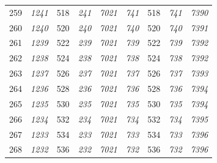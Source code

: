 \documentclass[10pt,fleqn]{article}
\begin{document}
\begin{longtable}{c|cccccccc}
259 & {\color{blue} \it 1241 \rm} & {\color{black} 518} & {\color{blue} \it 241 \rm} & {\color{blue} \it 7021 \rm} & {\color{blue} \it 741 \rm} & {\color{black} 518} & {\color{blue} \it 741 \rm} & {\color{blue} \it 7390 \rm} \\
260 & {\color{blue} \it 1240 \rm} & {\color{black} 520} & {\color{blue} \it 240 \rm} & {\color{blue} \it 7021 \rm} & {\color{blue} \it 740 \rm} & {\color{black} 520} & {\color{blue} \it 740 \rm} & {\color{blue} \it 7391 \rm} \\
261 & {\color{blue} \it 1239 \rm} & {\color{black} 522} & {\color{blue} \it 239 \rm} & {\color{blue} \it 7021 \rm} & {\color{blue} \it 739 \rm} & {\color{black} 522} & {\color{blue} \it 739 \rm} & {\color{blue} \it 7392 \rm} \\
262 & {\color{blue} \it 1238 \rm} & {\color{black} 524} & {\color{blue} \it 238 \rm} & {\color{blue} \it 7021 \rm} & {\color{blue} \it 738 \rm} & {\color{black} 524} & {\color{blue} \it 738 \rm} & {\color{blue} \it 7392 \rm} \\
263 & {\color{blue} \it 1237 \rm} & {\color{black} 526} & {\color{blue} \it 237 \rm} & {\color{blue} \it 7021 \rm} & {\color{blue} \it 737 \rm} & {\color{black} 526} & {\color{blue} \it 737 \rm} & {\color{blue} \it 7393 \rm} \\
264 & {\color{blue} \it 1236 \rm} & {\color{black} 528} & {\color{blue} \it 236 \rm} & {\color{blue} \it 7021 \rm} & {\color{blue} \it 736 \rm} & {\color{black} 528} & {\color{blue} \it 736 \rm} & {\color{blue} \it 7394 \rm} \\
265 & {\color{blue} \it 1235 \rm} & {\color{black} 530} & {\color{blue} \it 235 \rm} & {\color{blue} \it 7021 \rm} & {\color{blue} \it 735 \rm} & {\color{black} 530} & {\color{blue} \it 735 \rm} & {\color{blue} \it 7394 \rm} \\
266 & {\color{blue} \it 1234 \rm} & {\color{black} 532} & {\color{blue} \it 234 \rm} & {\color{blue} \it 7021 \rm} & {\color{blue} \it 734 \rm} & {\color{black} 532} & {\color{blue} \it 734 \rm} & {\color{blue} \it 7395 \rm} \\
267 & {\color{blue} \it 1233 \rm} & {\color{black} 534} & {\color{blue} \it 233 \rm} & {\color{blue} \it 7021 \rm} & {\color{blue} \it 733 \rm} & {\color{black} 534} & {\color{blue} \it 733 \rm} & {\color{blue} \it 7396 \rm} \\
268 & {\color{blue} \it 1232 \rm} & {\color{black} 536} & {\color{blue} \it 232 \rm} & {\color{blue} \it 7021 \rm} & {\color{blue} \it 732 \rm} & {\color{black} 536} & {\color{blue} \it 732 \rm} & {\color{blue} \it 7396 \rm} \\

\end{longtable}
\end{document}
